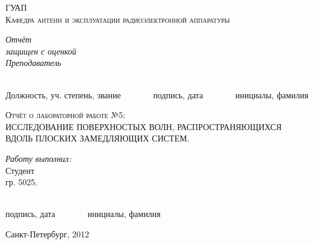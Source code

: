 \begin{titlepage}
\begin{center}
\textsc{\LARGE ГУАП}\\[2cm]
\textsc{\LARGE Кафедра антенн и эксплуатации радиоэлектронной 
 аппаратуры}
\\[1cm]


 \begin{flushleft} \large
  \emph{Отчёт} \\
   \emph{защищен с оценкой}
   \\[0.5cm]
   \emph{Преподаватель}\\[-4mm]
   \HRule\\[-4mm]
\end{flushleft}
\begin{flushright}
Должность, уч. степень, звание \ \ \ \ \ \ \ подпись, дата \ \ \ \ \ \ \ инициалы, фамилия \\[10mm]
\end{flushright}

\textsc{\Large Отчёт о лабораторной работе №5:} \\[1cm]
\textsc{\Large ИССЛЕДОВАНИЕ ПОВЕРХНОСТЫХ ВОЛН, РАСПРОСТРАНЯЮЩИХСЯ ВДОЛЬ ПЛОСКИХ ЗАМЕДЛЯЮЩИХ СИСТЕМ.}\\[1.5cm]


\begin{flushleft} \large
\emph{Работу выполнил:}\\
Студент\\ гр. 5025.\\[-4mm]
\HRule\\[-4mm]
\end{flushleft}
\begin{flushright}
подпись, дата \ \ \ \ \ \ \ инициалы, фамилия \\[10mm]
\end{flushright}

\vfill
Санкт-Петербург, 2012
\end{center}
\end{titlepage}